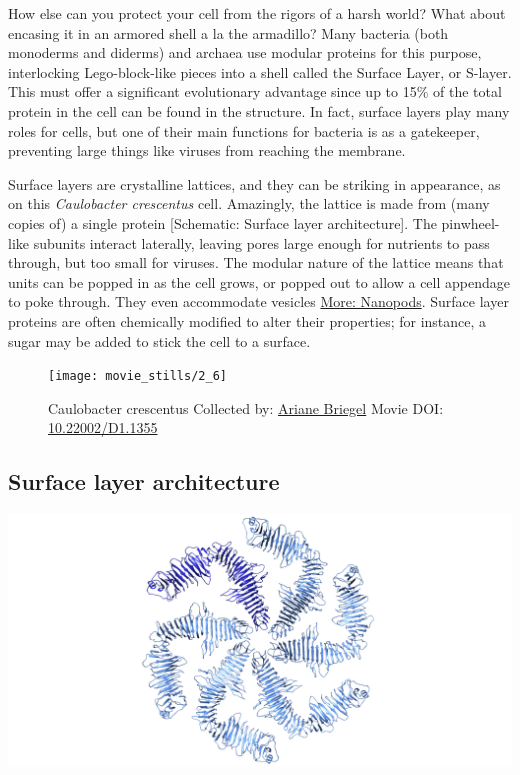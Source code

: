 \documentclass[]{tufte-book}
\begin{document}
How else can you protect your cell from the rigors of a harsh world?
What about encasing it in an armored shell a la the armadillo? Many
bacteria (both monoderms and diderms) and archaea use modular proteins
for this purpose, interlocking Lego-block-like pieces into a shell
called the Surface Layer, or S-layer. This must offer a significant
evolutionary advantage since up to 15\% of the total protein in the cell
can be found in the structure. In fact, surface layers play many roles
for cells, but one of their main functions for bacteria is as a
gatekeeper, preventing large things like viruses from reaching the
membrane.

Surface layers are crystalline lattices, and they can be striking in
appearance, as on this \emph{Caulobacter crescentus} cell. Amazingly,
the lattice is made from (many copies of) a single protein {[}Schematic:
Surface layer architecture{]}. The pinwheel-like subunits interact
laterally, leaving pores large enough for nutrients to pass through, but
too small for viruses. The modular nature of the lattice means that
units can be popped in as the cell grows, or popped out to allow a cell
appendage to poke through. They even accommodate vesicles
\protect\hyperlink{Nanopods}{More: Nanopods}. Surface layer proteins are
often chemically modified to alter their properties; for instance, a
sugar may be added to stick the cell to a surface.





\begin{figure}
\texttt{[image: movie\_stills/2\_6]} \caption[Caulobacter crescentus Collected by:
\protect\hyperlink{ariane_briegel}{Ariane Briegel} Movie DOI:
\href{https://doi.org/10.22002/D1.1355}{10.22002/D1.1355}]{Caulobacter crescentus Collected by:
\protect\hyperlink{ariane_briegel}{Ariane Briegel} Movie DOI:
\href{https://doi.org/10.22002/D1.1355}{10.22002/D1.1355}}\label{fig:2-6}
\end{figure}

\subsection{Surface layer
architecture}\label{Surface_layer_architecture}

\includegraphics{img/schematics/2_6_1}
\end{document}
